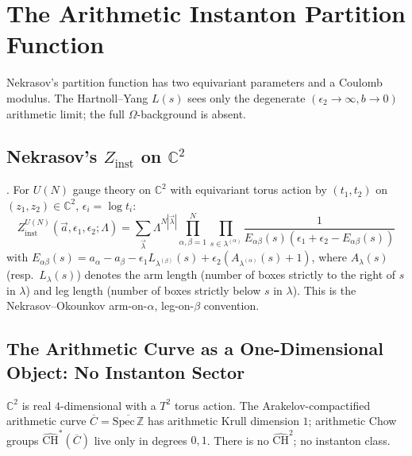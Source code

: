 \chapter{The Arithmetic Instanton Partition Function}
\label{v4-arith:nekrasov}

Nekrasov's partition function has two equivariant parameters and a
Coulomb modulus. The Hartnoll--Yang \(L(s)\) sees only the degenerate
\((\epsilon_2\to\infty,b\to0)\) arithmetic limit; the full
\(\Omega\)-background is absent.

\section{Nekrasov's \(Z_{\mathrm{inst}}\) on \(\mathbb{C}^{2}\)}
\label{v4-arith:nk:Z-inst}

\begin{theorem}
\label{v4-arith:thm:Z-inst-classical}
\ClaimStatusProvedElsewhere. For \(U(N)\) gauge theory on
\(\mathbb{C}^{2}\) with equivariant torus action by
\((t_{1},t_{2})\) on \((z_{1},z_{2})\in\mathbb{C}^{2}\),
\(\epsilon_{i}=\log t_{i}\):
\begin{equation*}
Z^{U(N)}_{\mathrm{inst}}(\vec a,\epsilon_{1},\epsilon_{2};\Lambda)
=\sum_{\vec\lambda}\Lambda^{N|\vec\lambda|}
\prod_{\alpha,\beta=1}^{N}\prod_{s\in\lambda^{(\alpha)}}
\frac{1}{E_{\alpha\beta}(s)(\epsilon_{1}+\epsilon_{2}-E_{\alpha\beta}(s))}
\end{equation*}
with \(E_{\alpha\beta}(s)=a_{\alpha}-a_{\beta}-\epsilon_{1}L_{\lambda^{(\beta)}}(s)+\epsilon_{2}(A_{\lambda^{(\alpha)}}(s)+1)\),
where \(A_{\lambda}(s)\) (resp.\ \(L_{\lambda}(s)\)) denotes the arm length (number of boxes
strictly to the right of \(s\) in \(\lambda\)) and leg length (number of boxes
strictly below \(s\) in \(\lambda\)). This is the Nekrasov--Okounkov
arm-on-\(\alpha\), leg-on-\(\beta\) convention.
\end{theorem}

\section{The Arithmetic Curve as a One-Dimensional Object: No Instanton Sector}
\label{v4-arith:nk:dimension-fails}

\begin{observation}
\label{v4-arith:obs:dimension-fails}
\(\mathbb{C}^{2}\) is real \(4\)-dimensional with a \(T^{2}\) torus
action. The Arakelov-compactified arithmetic curve
\(\overline{C}=\overline{\mathrm{Spec}\,\mathbb{Z}}\) has arithmetic
Krull dimension \(1\); arithmetic Chow groups
\(\widehat{\mathrm{CH}}^{*}(\overline{C})\) live only in degrees \(0,1\).
There is no \(\widehat{\mathrm{CH}}^{2}\); no instanton class.
\end{observation}

